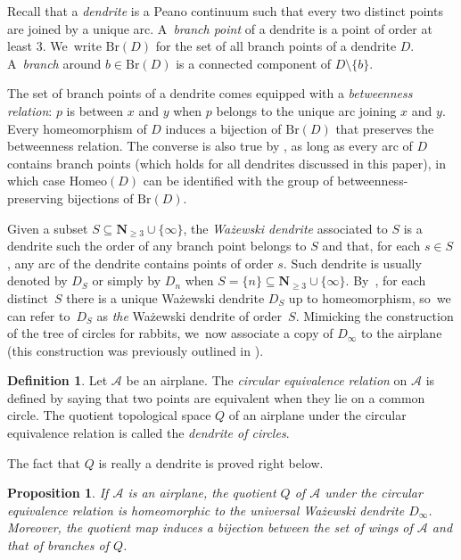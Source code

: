 \documentclass[JEP,XML,SOM,Unicode,NoFloatCountersInSection,published]{cedram}
\theoremstyle{plain}
\newtheorem{proposition}[theorem]{Proposition}
\theoremstyle{definition}
\newtheorem{definition}[theorem]{Definition}
\theoremstyle{remark}
\newcommand{\Homeo}{\mathrm{Homeo}}
\newcommand{\A}{\mathcal{A}}
\newcommand{\Br}{\mathrm{Br}}
\begin{document}
Recall that a \emph{dendrite} is a Peano continuum such that every two distinct points are joined by a unique arc. A~\emph{branch point} of a dendrite is a point of order at least $3$. We~write $\Br(D)$ for the set of all branch points of a dendrite $D$. A~\emph{branch} around $b \in \Br(D)$ is a connected component of $D \setminus \{b\}$.

The set of branch points of a dendrite comes equipped with a \emph{betweenness relation}: $p$ is between $x$ and $y$ when $p$ belongs to the unique arc joining $x$ and $y$.
Every homeomorphism of $D$ induces a bijection of $\Br(D)$ that preserves the betweenness relation.
The converse is also true by \cite[Prop.\,2.4]{Kaleidoscopic}, as long as every arc of $D$ contains branch points (which holds for all dendrites discussed in this paper), in which case $\Homeo(D)$ can be identified with the group of betweenness-preserving bijections of $\Br(D)$.

Given a subset $S \subseteq \mathbf{N}_{\geq 3} \cup \{\infty\}$, the \emph{Ważewski dendrite} associated to $S$ is a dendrite such the order of any branch point belongs to $S$ and that, for each $s \in S$, any arc of the dendrite contains points of order $s$.
Such dendrite is usually denoted by $D_S$ or simply by $D_n$ when $S = \{n\} \subseteq \mathbf{N}_{\geq 3} \cup \{\infty\}$. By~\cite[Th.\,6.2]{SelfHomeomorphicSpaces}, for each distinct~$S$ there is a unique Ważewski dendrite $D_S$ up to homeomorphism, so~we can refer to~$D_S$ as \textit{the} Ważewski dendrite of order~$S$.
Mimicking the construction of the tree of circles for rabbits, we~now associate a copy of $D_\infty$ to the airplane (this construction was previously outlined in \cite[\S 7.3]{dendriterearrangement}).

\begin{definition}
\label{def.dendrite.of.circles}
Let $\A$ be an airplane.
The \emph{circular equivalence relation} on $\A$ is defined by saying that two points are equivalent when they lie on a common circle.
The quotient topological space $Q$ of an airplane under the circular equivalence relation is called the \emph{dendrite of circles}.
\end{definition}

The fact that $Q$ is really a dendrite is proved right below.

\begin{proposition}
\label{prop.airplane.quotient}
If $\A$ is an airplane, the quotient $Q$ of $\A$ under the circular equivalence relation is homeomorphic to the universal Ważewski dendrite $D_\infty$.
Moreover, the quotient map induces a bijection between the set of wings of $\A$ and that of branches of $Q$.
\end{proposition}
\end{document}
